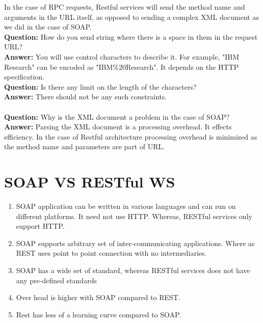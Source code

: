 \documentclass[twoside]{article}
\begin{document}
In the case of RPC requests, Restful services will send the method name and arguments in the URL itself, as opposed to sending a complex XML document as we did in the case of SOAP. \\
\textbf{Question:} How do you send string where there is a space in them in the request URL?\\
\textbf{Answer:} You will use control characters to describe it. For example, "IBM Research" can be encoded as "IBM\%20Research". It depends on the HTTP specification.\\
\textbf{Question:} Is there any limit on the length of the characters?\\
\textbf{Answer:} There should not be any such constraints.\\\\
\textbf{Question:} Why is the XML document a problem in the case of SOAP?\\
\textbf{Answer:} Parsing the XML document is a processing overhead. It effects efficiency. In the case of Restful architecture processing overhead is minimized as the method name and parameters are part of URL.\\

\section{SOAP VS RESTful WS}
\begin{enumerate}
    \item SOAP application can be written in various languages and can run on different platforms. It need not use HTTP. Whereas, RESTful services only support HTTP.
    \item SOAP supports arbitrary set of inter-communicating applications. Where as REST uses point to point connection with no intermediaries. 
    \item SOAP has a wide set of standard, whereas RESTful services does not have any pre-defined standards
    \item Over head is higher with SOAP compared to REST.
    \item Rest has less of a learning curve compared to SOAP.
\end{enumerate}
\end{document}
